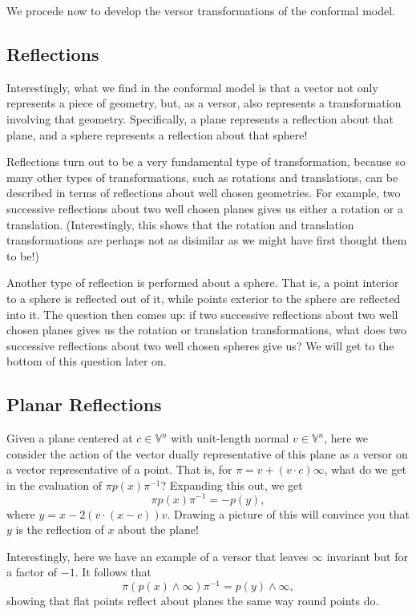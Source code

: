 \documentclass[12pt]{article}
\newcommand{\V}{\mathbb{V}}
\newcommand{\nvai}{\infty}
\begin{document}
We procede now to develop the versor transformations of the conformal model.

\subsection{Reflections}

Interestingly, what we find in the conformal model is that a vector
not only represents a piece of geometry, but, as a versor, also represents
a transformation involving that geometry.  Specifically, a plane represents
a reflection about that plane, and a sphere represents a reflection about that
sphere!

Reflections turn out to be a very fundamental type of transformation, because
so many other types of transformations, such as rotations and translations, can be described
in terms of reflections about well chosen geometries.  For example, two
successive reflections about two well chosen planes gives us either a rotation
or a translation.  (Interestingly, this shows that the rotation and translation
transformations are perhaps not as disimilar as we might have first thought them to be!)

Another type of reflection is performed about a sphere.  That is, a point
interior to a sphere is reflected out of it, while points exterior to the sphere
are reflected into it.  The question then comes up: if two successive
reflections about two well chosen planes gives us the rotation or
translation transformations, what does two successive reflections about
two well chosen spheres give us?  We will get to the bottom of this question later on.

\subsection{Planar Reflections}

Given a plane centered at $c\in\V^n$ with unit-length normal $v\in\V^n$,
here we consider the action of the vector dually representative of this plane
as a versor on a vector representative of a point.  That is, for $\pi=v+(v\cdot c)\nvai$,
what do we get in the evaluation of $\pi p(x)\pi^{-1}$?  Expanding this out, we get
\begin{equation*}
\pi p(x)\pi^{-1} = -p(y),
\end{equation*}
where $y=x-2(v\cdot (x-c))v$.  Drawing a picture
of this will convince you that $y$ is the reflection of $x$ about the plane!

Interestingly, here we have an example of a versor that leaves $\nvai$
invariant but for a factor of $-1$.  It follows that
\begin{equation*}
\pi(p(x)\wedge\nvai)\pi^{-1} = p(y)\wedge\nvai,
\end{equation*}
showing that flat points reflect about planes the same way round points do.
\end{document}

